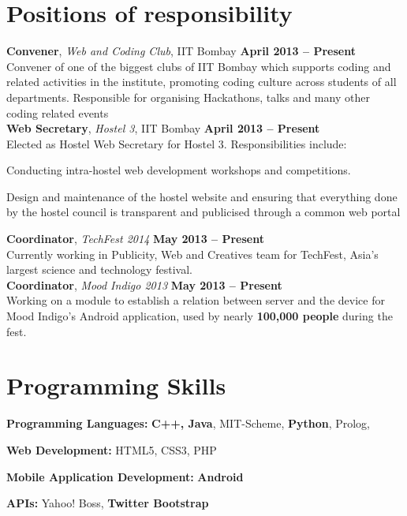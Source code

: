 \documentclass[margin,11pt]{resume}
\begin{document}
\begin{resume}
\pagebreak

\vspace{-10mm}
\section{\mysidestyle Positions of responsibility}
\textbf{Convener}, \textsl{Web and Coding Club}, IIT Bombay \hfill \textbf{April 2013 -- Present}\\
Convener of one of the biggest clubs of IIT Bombay which supports coding and related activities in the institute, promoting coding culture across students of all departments. Responsible for organising Hackathons, talks and many other coding related events
\vspace{2mm}\\
\textbf{Web Secretary}, \textsl{Hostel 3}, IIT Bombay \hfill \textbf{April 2013 -- Present}\\
Elected as Hostel Web Secretary for Hostel 3. Responsibilities include:
\begin{list2}
\item Conducting intra-hostel web development workshops and competitions.
\item Design and maintenance of the hostel website and ensuring that everything done by the hostel council is transparent and publicised through a common web portal
\end{list2}
\vspace{-3mm}
\textbf{Coordinator}, \textsl{TechFest 2014} \hfill \textbf{May 2013 -- Present}\\
Currently working in Publicity, Web and Creatives team for TechFest, Asia's largest science and technology festival.
\vspace{2mm}\\
\textbf{Coordinator}, \textsl{Mood Indigo 2013} \hfill \textbf{May 2013 -- Present}\\
Working on a module to establish a relation between server and the device for Mood Indigo's Android application, used by nearly \textbf{100,000 people} during the fest.

\section{\mysidestyle Programming Skills}
\begin{list2}
\item \textbf{Programming Languages:} \textbf{C++, Java}, MIT-Scheme, \textbf{Python}, Prolog, \LaTeXe{}
\item \textbf{Web Development:} HTML5, CSS3, PHP
\item \textbf{Mobile Application Development:} \textbf{Android}
\item \textbf{APIs:} Yahoo! Boss, \textbf{Twitter Bootstrap}
\end{list2}


\end{resume}
\end{document}

